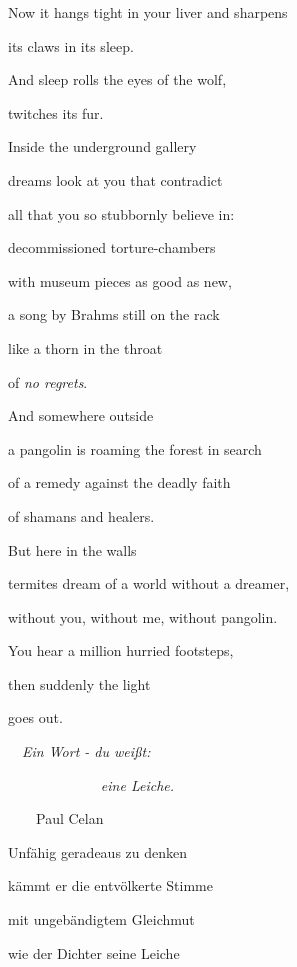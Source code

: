 Now it hangs tight in your liver and sharpens

its claws in its sleep.

And sleep rolls the eyes of the wolf,

twitches its fur.


\bigskip

Inside the underground gallery 

dreams look at you that contradict 

all that you so stubbornly believe in:

decommissioned torture-chambers

with museum pieces as good as new,

a song by Brahms still on the rack

like a thorn in the throat

of \emph{no regrets}.


\bigskip

And somewhere outside

a pangolin is roaming the forest in search 

of a remedy against the deadly faith

of shamans and healers.


\bigskip

But here in the walls

termites dream of a world without a dreamer,

without you, without me, without pangolin.


\bigskip

You hear a million hurried footsteps,

then suddenly the light

goes out.


\bigskip


\bigskip


\bigskip



\bigskip

\ \  \emph{Ein Wort - du weißt:}

\emph{\ \ \ \ \ \ \ \ \ \ \ \ }\ \emph{eine Leiche.}

\ \ \ \  Paul Celan


\bigskip

Unfähig geradeaus zu denken

kämmt er die entvölkerte Stimme

mit ungebändigtem Gleichmut 

wie der Dichter seine Leiche


